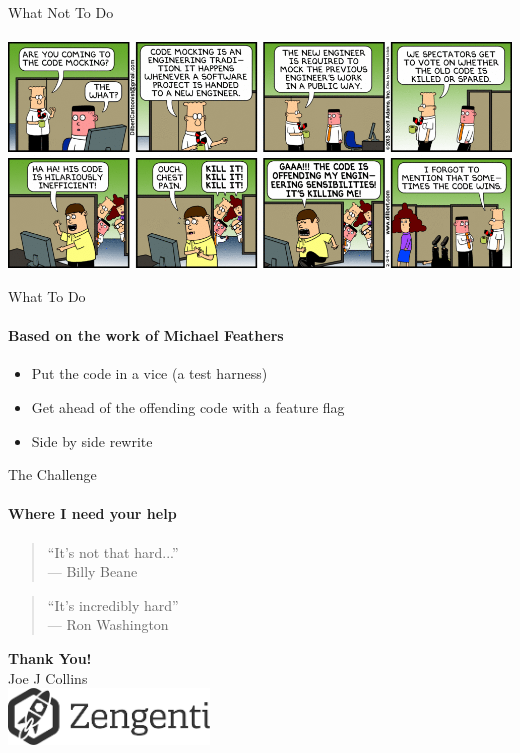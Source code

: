 \documentclass[bigger]{beamer}
\begin{document}
\begin{frame}{What Not To Do}
  \framesubtitle{}
  \includegraphics[width=\textwidth]{images/code-mocking.png}
\end{frame}

\begin{frame}{What To Do}
  \framesubtitle{Based on the work of Michael Feathers}
  \begin{itemize}
    \item Put the code in a vice (a test harness)
    \item Get ahead of the offending code with a feature flag
    \item Side by side rewrite
  \end{itemize}
  \note{
  }
\end{frame}

\begin{frame}{The Challenge}
  \framesubtitle{Where I need your help}
  \begin{quote}
    ``It's not that hard...''\\
    \hfill --- Billy Beane
  \end{quote}
  \bigskip
  \begin{quote}
    ``It's incredibly hard''\\
    \hfill --- Ron Washington
  \end{quote}
  \bigskip
\end{frame}

\begin{frame}[plain]
  \centering
  {\Huge \bfseries Thank You!}\\[1cm]
  {\large Joe J Collins} \\[0.5cm]
  \includegraphics[height=1.5cm]{images/zengenti.png}
\end{frame}
\end{document}
